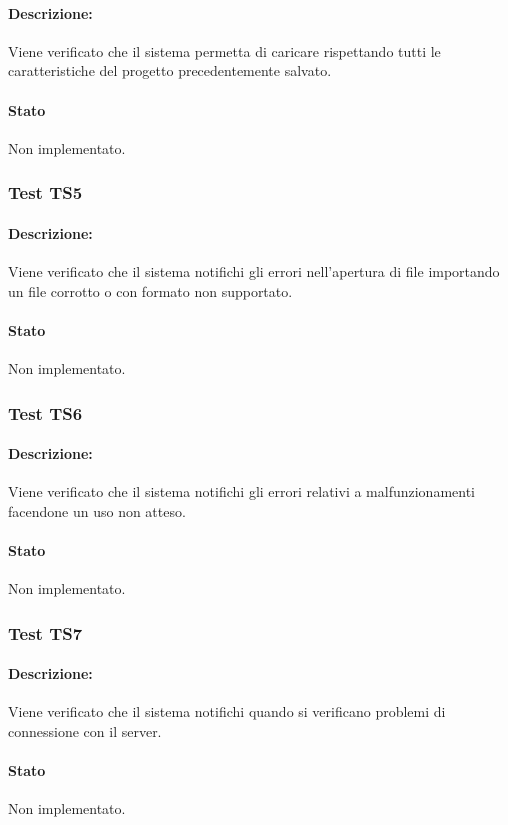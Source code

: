 \documentclass[../PianoDiQualifica.tex]{subfiles}
\begin{document}
	\paragraph{Descrizione:} Viene verificato che il sistema permetta di caricare rispettando tutti le caratteristiche del progetto precedentemente salvato.
	\paragraph{Stato} Non implementato.
	
	\subsubsection{Test TS5} 
	\paragraph{Descrizione:} Viene verificato che il sistema notifichi
	gli errori nell'apertura di file importando un file corrotto o con
	formato non supportato.
	\paragraph{Stato} Non implementato.
	
	\subsubsection{Test TS6} 
	\paragraph{Descrizione:} Viene verificato che il sistema notifichi gli errori relativi a malfunzionamenti	facendone un uso non atteso.
	\paragraph{Stato} Non implementato.
	
	\subsubsection{Test TS7} 
	\paragraph{Descrizione:} Viene verificato che il sistema notifichi quando si verificano problemi di connessione con il server.
	\paragraph{Stato} Non implementato.
	
\end{document}
